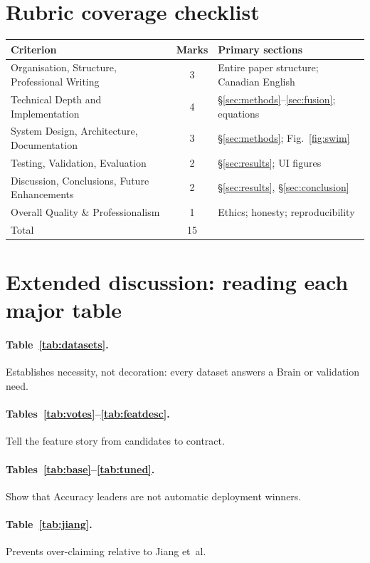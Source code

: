 \documentclass[11pt,a4paper]{article}
\begin{document}
\section*{Rubric coverage checklist}
\begin{center}
\small
\begin{tabular}{@{}p{5.2cm}cp{6.5cm}@{}}
\toprule
\textbf{Criterion} & \textbf{Marks} & \textbf{Primary sections} \\
\midrule
Organisation, Structure, Professional Writing & 3 & Entire paper structure; Canadian English \\
Technical Depth and Implementation & 4 & \S\ref{sec:methods}--\ref{sec:fusion}; equations \\
System Design, Architecture, Documentation & 3 & \S\ref{sec:methods}; Fig.~\ref{fig:swim} \\
Testing, Validation, Evaluation & 2 & \S\ref{sec:results}; UI figures \\
Discussion, Conclusions, Future Enhancements & 2 & \S\ref{sec:results}, \S\ref{sec:conclusion} \\
Overall Quality \& Professionalism & 1 & Ethics; honesty; reproducibility \\
\midrule
Total & 15 & \\
\bottomrule
\end{tabular}
\end{center}

\section*{Extended discussion: reading each major table}
\paragraph{Table~\ref{tab:datasets}.} Establishes necessity, not decoration: every dataset answers a Brain or validation need.
\paragraph{Tables~\ref{tab:votes}--\ref{tab:featdesc}.} Tell the feature story from candidates to contract.
\paragraph{Tables~\ref{tab:base}--\ref{tab:tuned}.} Show that Accuracy leaders are not automatic deployment winners.
\paragraph{Table~\ref{tab:jiang}.} Prevents over-claiming relative to Jiang et~al.
\end{document}
